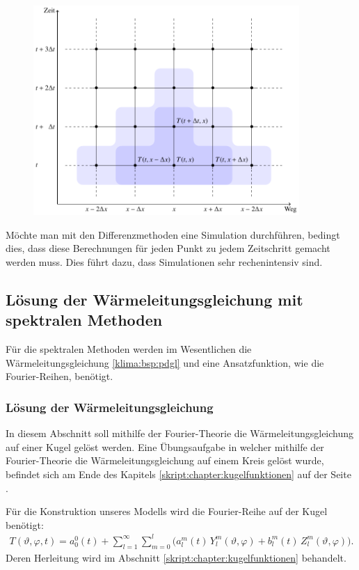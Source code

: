 \begin{refsection}
\begin{figure}
\centering
\includegraphics[width=0.9\textwidth]{klima/differenzen.pdf}
\caption{
\label{klima:wettervorhersagen:diff}}
\end{figure}

Möchte man mit den Differenzmethoden eine Simulation durchführen, bedingt dies, dass diese Berechnungen für jeden Punkt zu jedem Zeitschritt gemacht werden muss. Dies führt dazu, dass Simulationen sehr rechenintensiv sind.

\subsection{Lösung der Wärmeleitungsgleichung mit spektralen Methoden}
Für die spektralen Methoden werden im Wesentlichen die Wärmeleitungsgleichung \eqref{klima:bsp:pdgl}
und eine Ansatzfunktion, wie die Fourier-Reihen, benötigt.

\subsubsection{Lösung der Wärmeleitungsgleichung}
In diesem Abschnitt soll mithilfe der Fourier-Theorie die Wärmeleitungsgleichung auf einer Kugel gelöst werden. Eine Übungsaufgabe in welcher mithilfe der Fourier-Theorie die  Wärmeleitungsgleichung auf einem Kreis gelöst wurde, befindet sich am Ende des Kapitels \ref{skript:chapter:kugelfunktionen}  auf der Seite \pageref{skript:1101:pdgl}.

Für die Konstruktion unseres Modells wird die Fourier-Reihe auf der Kugel benötigt:
\begin{align}
T(\vartheta ,\varphi ,t)
=
a^0_0(t) + \sum_{l=1}^\infty\sum_{m=0}^l \bigl( a^m_l(t)\,Y^m_l(\vartheta ,\varphi)+b^m_l(t)\,Z^m_l(\vartheta ,\varphi) \bigr).
\label{klima:equation:fourier}
\end{align}
Deren Herleitung wird im Abschnitt \ref{skript:chapter:kugelfunktionen}  behandelt.


\end{refsection}
